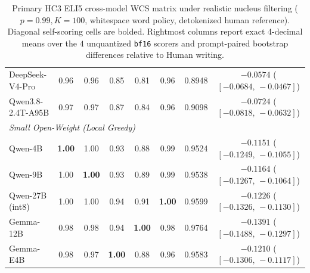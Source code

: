 \documentclass[11pt]{article}
\begin{document}
\begin{table}[t]
{\begin{tabular}{lccccccc}
DeepSeek-V4-Pro & 0.96 & 0.96 & 0.85 & 0.81 & 0.96 & 0.8948 & $-0.0574$ ($[-0.0684,\,-0.0467]$) \\
Qwen3.8-2.4T-A95B & 0.97 & 0.97 & 0.87 & 0.84 & 0.96 & 0.9098 & $-0.0724$ ($[-0.0818,\,-0.0632]$) \\
\midrule
\multicolumn{7}{l}{\textit{Small Open-Weight (Local Greedy)}} \\
Qwen-4B & \textbf{1.00} & 1.00 & 0.93 & 0.88 & 0.99 & 0.9524 & $-0.1151$ ($[-0.1249,\,-0.1055]$) \\
Qwen-9B & 1.00 & \textbf{1.00} & 0.93 & 0.89 & 0.99 & 0.9538 & $-0.1164$ ($[-0.1267,\,-0.1064]$) \\
Qwen-27B (int8) & 1.00 & 1.00 & 0.94 & 0.91 & \textbf{1.00} & 0.9599 & $-0.1226$ ($[-0.1326,\,-0.1130]$) \\
Gemma-12B & 0.98 & 0.98 & 0.94 & \textbf{1.00} & 0.98 & 0.9764 & $-0.1391$ ($[-0.1488,\,-0.1297]$) \\
Gemma-E4B & 0.98 & 0.97 & \textbf{1.00} & 0.88 & 0.96 & 0.9583 & $-0.1210$ ($[-0.1306,\,-0.1117]$) \\
\bottomrule
\end{tabular}%
}
\caption{Primary HC3 ELI5 cross-model WCS matrix under realistic nucleus filtering ($p=0.99, K=100$, whitespace word policy, detokenized human reference). Diagonal self-scoring cells are bolded. Rightmost columns report exact 4-decimal means over the $4$ unquantized \texttt{bf16} scorers and prompt-paired bootstrap differences relative to Human writing.}
\label{tab:eli5_p99}
\end{table}
\end{document}
